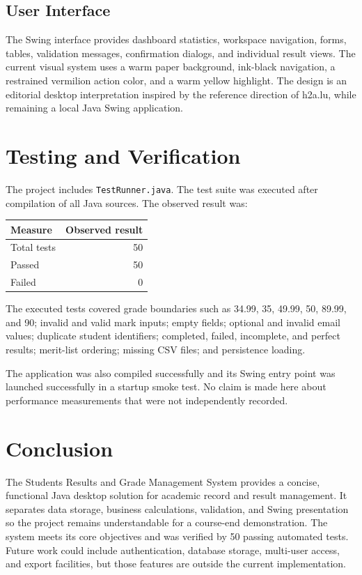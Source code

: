 \documentclass[11pt,a4paper]{report}
\begin{document}
\subsection{User Interface}
The Swing interface provides dashboard statistics, workspace navigation, forms, tables, validation messages, confirmation dialogs, and individual result views. The current visual system uses a warm paper background, ink-black navigation, a restrained vermilion action color, and a warm yellow highlight. The design is an editorial desktop interpretation inspired by the reference direction of h2a.lu, while remaining a local Java Swing application.

\section{Testing and Verification}
The project includes \texttt{TestRunner.java}. The test suite was executed after compilation of all Java sources. The observed result was:

\begin{center}
\begin{tabular}{|l|r|}
\hline
\textbf{Measure} & \textbf{Observed result}\\ \hline
Total tests & 50\\ \hline
Passed & 50\\ \hline
Failed & 0\\ \hline
\end{tabular}
\end{center}

The executed tests covered grade boundaries such as 34.99, 35, 49.99, 50, 89.99, and 90; invalid and valid mark inputs; empty fields; optional and invalid email values; duplicate student identifiers; completed, failed, incomplete, and perfect results; merit-list ordering; missing CSV files; and persistence loading.

The application was also compiled successfully and its Swing entry point was launched successfully in a startup smoke test. No claim is made here about performance measurements that were not independently recorded.

\section{Conclusion}
The Students Results and Grade Management System provides a concise, functional Java desktop solution for academic record and result management. It separates data storage, business calculations, validation, and Swing presentation so the project remains understandable for a course-end demonstration. The system meets its core objectives and was verified by 50 passing automated tests. Future work could include authentication, database storage, multi-user access, and export facilities, but those features are outside the current implementation.
\end{document}
